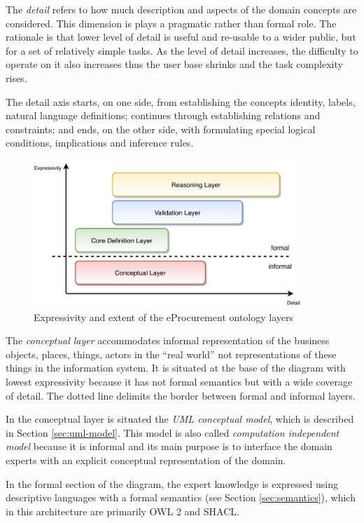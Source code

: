 	The \textit{detail} refers to how much description and aspects of the domain concepts are considered. This dimension is plays a pragmatic rather than formal role. The rationale is that lower level of detail is useful and re-usable to a wider public, but for a set of relatively simple tasks. As the level of detail increases, the difficulty to operate on it also increases thus the user base shrinks and the task complexity rises. 
	
	The detail axis starts, on one side, from establishing the concepts identity, labels, natural language  definitions; continues through establishing relations and constraints; and ends, on the other side, with formulating special logical conditions, implications and inference rules.
	
	\begin{figure}[!ht]
		\centering
		\includegraphics[width=0.9\textwidth]{../img/eProcurement-layers}
		\caption{Expressivity and extent of the eProcurement ontology layers}
		\label{fig:layers}
	\end{figure}
	
	The \textit{conceptual layer} accommodates informal representation of the business objects, places, things, actors in the ``real world'' not representations of these things in the information system. It is situated at the base of the diagram with lowest expressivity because it has not formal semantics but with a wide coverage of detail. The dotted line delimits the border between formal and informal layers.
	
	In the conceptual layer is situated the \textit{UML conceptual model}, which is described in Section \ref{sec:uml-model}. This model is also called \textit{computation independent model} because it is informal and its main purpose is to interface the domain experts with an explicit conceptual representation of the domain.
		
	In the formal section of the diagram, the expert knowledge is expressed using descriptive languages with a formal semantics (see Section \ref{sec:semantics}), which in this architecture are primarily OWL 2\cite{owl2} and SHACL\cite{shacl-spec}. 
		
